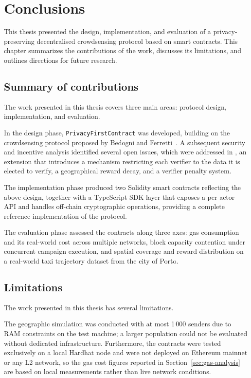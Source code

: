 \chapter{Conclusions}\label{ch:conclusions}
This thesis presented the design, implementation, and evaluation of a
privacy-preserving decentralised crowdsensing protocol based on smart contracts.
This chapter summarizes the contributions of the work, discusses its
limitations, and outlines directions for future research.

\section{Summary of contributions}\label{sec:conclusion-contributions-summary}
The work presented in this thesis covers three main areas: protocol design,
implementation, and evaluation.

In the design phase, \texttt{PrivacyFirstContract} was developed, building
on the crowdsensing protocol proposed by Bedogni and Ferretti~\cite{bedogni2024crowdsensing}.
A subsequent security and incentive analysis identified several open issues,
which were addressed in \texttt{},
an extension that introduces a mechanism restricting each verifier to the data it is elected to verify,
a geographical reward decay, and a verifier penalty system.

The implementation phase produced two Solidity smart contracts reflecting
the above design, together with a TypeScript SDK layer that exposes a
per-actor API and handles off-chain cryptographic operations, providing a
complete reference implementation of the protocol.

The evaluation phase assessed the contracts along three axes: gas
consumption and its real-world cost across multiple networks, block
capacity contention under concurrent campaign execution, and spatial
coverage and reward distribution on a real-world taxi trajectory dataset
from the city of Porto.

\section{Limitations}\label{sec:conclusion-limitations}
The work presented in this thesis has several limitations.

The geographic simulation was conducted with at most 1\,000 senders due to
RAM constraints on the test machine; a larger population could not be
evaluated without dedicated infrastructure.
Furthermore, the contracts were tested exclusively on a local Hardhat node
and were not deployed on Ethereum mainnet or any L2 network, so the
gas cost figures reported in Section~\ref{sec:gas-analysis} are based on
local measurements rather than live network conditions.

